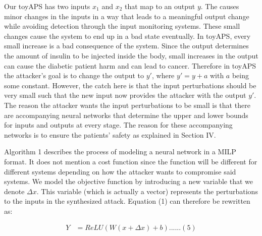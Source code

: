 Our toyAPS has two inputs $x_1$ and $x_2$ that map to an output $y$. The \attack causes minor changes in the inputs in a way that leads to a meaningful output change while avoiding detection through the input monitoring systems. These small changes cause the system to end up in a bad state eventually. In toyAPS, every small increase is a bad consequence of the system. Since the output determines the amount of insulin to be injected inside the body, small increases in the output can cause the diabetic patient harm \cite{ZHANG2019403} and can lead to cancer. 
Therefore in toyAPS the attacker's goal is to change the output to $y'$, where $y' = y + a$ with $a$ being some constant. %
However, the catch here is that the input perturbations should be very small such that the new input now provides the attacker with the output $y'$. The reason the attacker wants the input perturbations to be small is that there are accompanying neural networks that determine the upper and lower bounds for inputs and outputs at every stage. The reason for these accompanying networks is to ensure the patients' safety as explained in Section IV.%

Algorithm 1 describes the process of modeling a neural network in a MILP format. It does not mention a cost function since the function will be different for different systems depending on how the attacker wants to compromise said systems. We model the objective function by introducing a new variable that we denote $\Delta x$. This variable (which is actually a vector) represents the perturbations to the inputs in the synthesized attack. Equation (1) can therefore be rewritten as:

\begin{align}
Y &=  ReLU(W(x + \Delta x ) + b) ...... (5)
\end{align}

